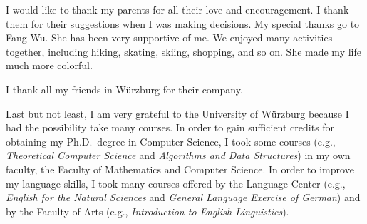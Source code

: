 I would like to thank my parents
for all their love and encouragement.
I thank them for their suggestions 
when I was making decisions.
My special thanks go to Fang Wu.
She has been very supportive of me.
We enjoyed many activities together, 
including hiking, skating, skiing, shopping, and so on.
She made my life much more colorful.

I thank all my friends in W\"urzburg
for their company.

Last but not least, 
I am very grateful to the University of W\"urzburg 
because I had the possibility take many courses.
In order to gain sufficient credits for 
obtaining my Ph.D.\ degree in Computer Science,
I took some courses
(e.g., \emph{Theoretical Computer Science}
and \emph{Algorithms and Data Structures})
in my own faculty, 
the Faculty of Mathematics and Computer Science.
%
In order to improve my language skills,
I took many courses
offered by the Language Center
(e.g., \emph{English for the Natural Sciences} 
and \emph{General Language Exercise of German})
and by the Faculty of Arts 
(e.g., \emph{Introduction to English Linguistics}).

